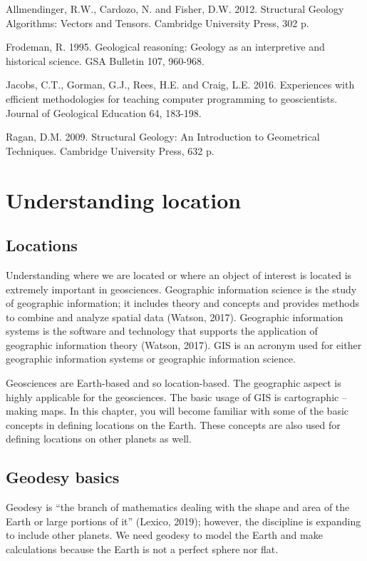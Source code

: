 \documentclass[a4paper , 12pt]{book}
\begin{document}
Allmendinger, R.W., Cardozo, N. and Fisher, D.W. 2012. Structural Geology Algorithms: Vectors and Tensors. Cambridge University Press, 302 p.

Frodeman, R. 1995. Geological reasoning: Geology as an interpretive and historical science. GSA Bulletin 107, 960-968.

Jacobs, C.T., Gorman, G.J., Rees, H.E. and Craig, L.E. 2016. Experiences with efficient methodologies for teaching computer programming to geoscientists. Journal of Geological Education 64, 183-198.

Ragan, D.M. 2009. Structural Geology: An Introduction to Geometrical Techniques. Cambridge University Press, 632 p.

\chapter{Understanding location}

\section{Locations}

Understanding where we are located or where an object of interest is located is extremely important in geosciences. Geographic information science is the study of geographic information; it includes theory and concepts and provides methods to combine and analyze spatial data (Watson, 2017). Geographic information systems is the software and technology that supports the application of geographic information theory (Watson, 2017). GIS is an acronym used for either geographic information systems or geographic information science. 

Geosciences are Earth-based and so location-based. The geographic aspect is highly applicable for the geosciences. The basic usage of GIS is cartographic – making maps. In this chapter, you will become familiar with some of the basic concepts in defining locations on the Earth. These concepts are also used for defining locations on other planets as well.

\section{Geodesy basics}

Geodesy is “the branch of mathematics dealing with the shape and area of the Earth or large portions of it” (Lexico, 2019); however, the discipline is expanding to include other planets. We need geodesy to model the Earth and make calculations because the Earth is not a perfect sphere nor flat.
\end{document}
